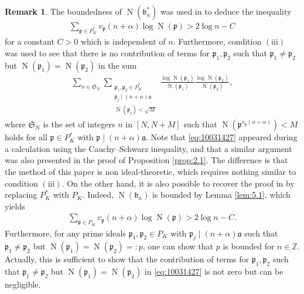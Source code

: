 \documentclass[a4paper,11pt]{amsart}
\theoremstyle{definition}
\newtheorem{remark}[theorem]{Remark}
\numberwithin{equation}{section}
\DeclareMathOperator{\norm}{N}
\begin{document}
\begin{remark}
The boundedness of $\norm(\mathfrak{b}_n^*)$ was used in \cite{Cassels1961} to deduce the inequality
\begin{align*}
\sum_{\mathfrak{p} \in P_K^*} v_{\mathfrak{p}}(n+\alpha) \log{\norm(\mathfrak{p})} 
> 2 \log{n}-C
\end{align*}
for a constant $C>0$ which is independent of $n$. 
Furthermore, condition $(\mathrm{iii})$ was used to see that there is no contribution of terms for $\mathfrak{p}_1, \mathfrak{p}_2$ such that $\mathfrak{p}_1 \neq \mathfrak{p}_2$ but $\norm(\mathfrak{p}_1)=\norm(\mathfrak{p}_2)$ in the sum
\begin{align}\label{eq:10031427}
\sum_{n \in \mathfrak{S}_N}
\sum_{\substack{\mathfrak{p}_1, \mathfrak{p}_2 \in P_K^* \\ \mathfrak{p}_j \mid (n+\alpha)\mathfrak{a} \\ \norm(\mathfrak{p}_j)<\sqrt{M}}} \frac{\log{\norm(\mathfrak{p}_1)}}{\norm(\mathfrak{p}_1)} \frac{\log{\norm(\mathfrak{p}_2)}}{\norm(\mathfrak{p}_2)}, 
\end{align}
where $\mathfrak{S}_N$ is the set of integers $n$ in $[N,N+M]$ such that $\norm(\mathfrak{p}^{v_{\mathfrak{p}}(n+\alpha)})<M$ holds for all $\mathfrak{p} \in P_K^*$ with $\mathfrak{p} \mid (n+\alpha)\mathfrak{a}$.
Note that \eqref{eq:10031427} appeared during a calculation using the Cauchy--Schwarz inequality, and that a similar argument was also presented in the proof of Proposition \ref{prop:2.1}. 
The difference is that the method of this paper is non ideal-theoretic, which requires nothing similar to condition $(\mathrm{iii})$. 
On the other hand, it is also possible to recover the proof in \cite{Cassels1961} by replacing $P_K^*$ with $P_K$. 
Indeed, $\norm(\mathfrak{b}_n)$ is bounded by Lemma \ref{lem:5.1}, which yields
\begin{align*}
\sum_{\mathfrak{p} \in P_K} v_{\mathfrak{p}}(n+\alpha) \log{\norm(\mathfrak{p})} 
> 2 \log{n}-C. 
\end{align*} 
Furthermore, for any prime ideals $\mathfrak{p}_1, \mathfrak{p}_2 \in P_K$ with $\mathfrak{p}_j \mid (n+\alpha)\mathfrak{a}$ such that $\mathfrak{p}_1 \neq \mathfrak{p}_2$ but $\norm(\mathfrak{p}_1)=\norm(\mathfrak{p}_2)=:p$, one can show that $p$ is bounded for $n \in \mathbb{Z}$. 
Actually, this is sufficient to show that the contribution of terms for $\mathfrak{p}_1, \mathfrak{p}_2$ such that $\mathfrak{p}_1 \neq \mathfrak{p}_2$ but $\norm(\mathfrak{p}_1)=\norm(\mathfrak{p}_2)$ in \eqref{eq:10031427} is not zero but can be negligible. 
\end{remark}
\end{document}
